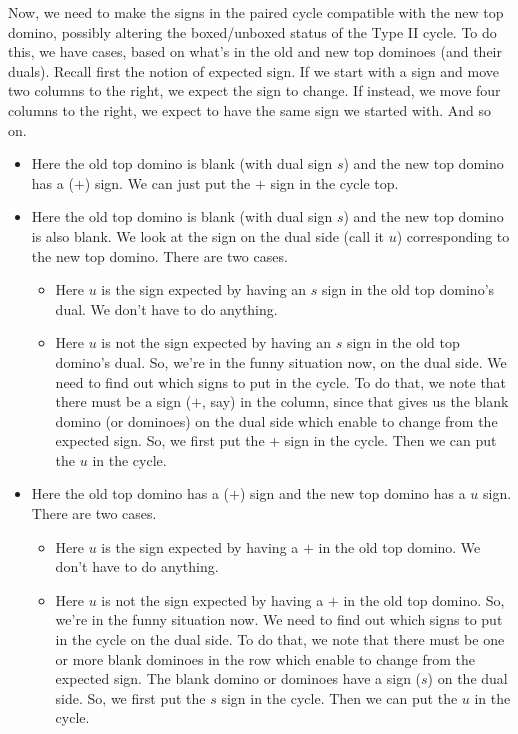 \documentclass[12pt]{article}
\numberwithin{equation}{section}
\begin{document}
  Now, we need to make the signs in the paired cycle compatible with the new top domino, possibly altering the boxed/unboxed status of the Type II cycle.
  To do this, we have cases, based on what's in the old and new top dominoes (and their duals).
  Recall first the notion of expected sign.
  If we start with a sign and move two columns to the right, we expect the sign to change.
  If instead, we move four columns to the right, we expect to have the same sign we started with.
  And so on.
  \begin{itemize}
    \item Here the old top domino is blank (with dual sign $s$) and the new top domino has a ($+$) sign.
    We can just put the $+$ sign in the cycle top.

    \item Here the old top domino is blank (with dual sign $s$) and the new top domino is also blank.
    We look at the sign on the dual side (call it $u$) corresponding to the new top domino.
    There are two cases.
    \begin{itemize}
      \item Here $u$ is the sign expected by having an $s$ sign in the old top domino's dual.
      We don't have to do anything.

      \item Here $u$ is not the sign expected by having an $s$ sign in the old top domino's dual.
      So, we're in the funny situation now, on the dual side.
      We need to find out which signs to put in the cycle.
      To do that, we note that there must be a sign ($+$, say) in the column, since that gives us the blank domino (or dominoes) on the dual side which enable to change from the expected sign.
      So, we first put the $+$ sign in the cycle.
      Then we can put the $u$ in the cycle.
    \end{itemize}

    \item Here the old top domino has a ($+$) sign and the new top domino has a $u$ sign.
    There are two cases.
    \begin{itemize}
      \item Here $u$ is the sign expected by having a $+$ in the old top domino.
      We don't have to do anything.

      \item Here $u$ is not the sign expected by having a $+$ in the old top domino.
      So, we're in the funny situation now.
      We need to find out which signs to put in the cycle on the dual side.
      To do that, we note that there must be one or more blank dominoes in the row which enable to change from the expected sign.
      The blank domino or dominoes have a sign ($s$) on the dual side.
      So, we first put the $s$ sign in the cycle.
      Then we can put the $u$ in the cycle.
    \end{itemize}


\end{itemize}
\end{document}

